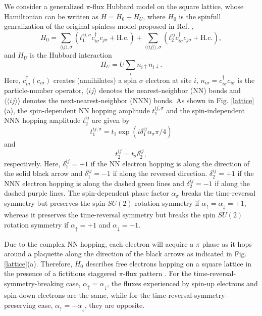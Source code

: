 \documentclass[amsmath,superscriptaddress,showpacs,aps,prb,twocolumn]{revtex4-1}
\begin{document}
\par We consider a generalized $\pi$-flux Hubbard model on the square lattice, whose Hamiltonian can be written as $H=H_0+H_U$, where $H_0$ is the spinfull genralization of the original spinless model proposed in Ref. ,
\begin{equation}
H_0=\sum_{\langle ij\rangle,\sigma}(t_1^{ij,\sigma}c_{i\sigma}^\dagger c_{j\sigma}+\text{H.c.})
    +\sum_{\langle\langle ij\rangle\rangle,\sigma}(t_2^{ij}c_{i\sigma}^\dagger c_{j\sigma}+\text{H.c.}),
\end{equation}
and $H_U$ is the Hubbard interaction
\begin{equation}
H_U=U\sum_{i}n_{i\uparrow}n_{i\downarrow}.
\end{equation}
Here, $c_{i\sigma}^{\dagger}(c_{i\sigma})$ creates (annihilates) a spin $\sigma$ electron at site $i$, $n_{i\sigma}=c^{\dag}_{i\sigma}c_{i\sigma}$ is the particle-number operator, $\langle ij\rangle$ denotes the nearest-neighbor (NN) bonds and $\langle\langle ij\rangle\rangle$ denotes the next-nearest-neighbor (NNN) bonds. As shown in Fig. \ref{lattice}(a), the spin-dependent NN hopping amplitude $t_1^{ij,\sigma}$ and the spin-independent NNN hopping amplitude $t_2^{ij}$ are given by
\begin{equation}
t_1^{ij,\sigma}=t_1\exp\left(i\delta_1^{ij}\alpha_\sigma\pi/4\right)
\end{equation}
and
\begin{equation}
t_2^{ij}=t_2\delta_2^{ij},
\end{equation}
respectively. Here, $\delta_1^{ij}=+1$ if the NN electron hopping is along the direction of the solid black arrow and $\delta_1^{ij}=-1$ if along the reversed direction. $\delta_2^{ij}=+1$ if the NNN electron hopping is along the dashed green lines and $\delta_2^{ij}=-1$ if along the dashed purple lines. The spin-dependent phase factor $\alpha_\sigma$ breaks the time-reversal symmetry but preserves the spin $SU(2)$ rotation symmetry if $\alpha_\uparrow=\alpha_\downarrow=+1$, whereas it preserves the time-reversal symmetry but breaks the spin $SU(2)$ rotation symmetry if $\alpha_\uparrow=+1$ and $\alpha_\downarrow=-1$.

\par Due to the complex NN hopping, each electron will acquire a $\pi$ phase as it hops around a plaquette along the direction of the black arrows as indicated in Fig. \ref{lattice}(a). Therefore, $H_0$ describes free electrons hopping on a square lattice in the presence of a fictitious staggered $\pi$-flux pattern \cite{WWZ_PRB1989}. For the time-reversal-symmetry-breaking case, $\alpha_\uparrow=\alpha_\downarrow$, the fluxes experienced by spin-up electrons and spin-down electrons are the same, while for the time-reversal-symmetry-preserving case, $\alpha_\uparrow=-\alpha_\downarrow$, they are opposite.
\end{document}
